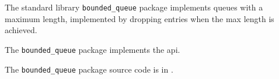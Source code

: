 
The standard library {\tt bounded\_queue} package implements queues with a maximum length, implemented by dropping entries when the max length is achieved.

The {\tt bounded\_queue} package implements the  api.

The {\tt bounded\_queue} package source code is in .



